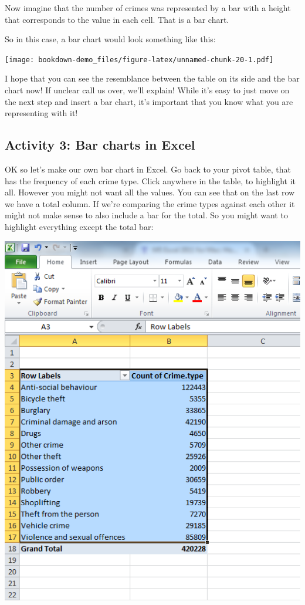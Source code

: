 \documentclass[]{book}
\theoremstyle{definition}
\theoremstyle{definition}
\theoremstyle{definition}
\theoremstyle{remark}
\begin{document}
Now imagine that the number of crimes was represented by a bar with a
height that corresponds to the value in each cell. That is a bar chart.

So in this case, a bar chart would look something like this:

\texttt{[image: bookdown-demo\_files/figure-latex/unnamed-chunk-20-1.pdf]}

I hope that you can see the resemblance between the table on its side
and the bar chart now! If unclear call us over, we'll explain! While
it's easy to just move on the next step and insert a bar chart, it's
important that you know what you are representing with it!

\hypertarget{activity-3-bar-charts-in-excel}{%
\subsection{Activity 3: Bar charts in
Excel}\label{activity-3-bar-charts-in-excel}}

OK so let's make our own bar chart in Excel. Go back to your pivot
table, that has the frequency of each crime type. Click anywhere in the
table, to highlight it all. However you might not want all the values.
You can see that on the last row we have a total column. If we're
comparing the crime types against each other it might not make sense to
also include a bar for the total. So you might want to highlight
everything except the total bar:

\includegraphics{imgs/crime_type_table.png}
\end{document}
